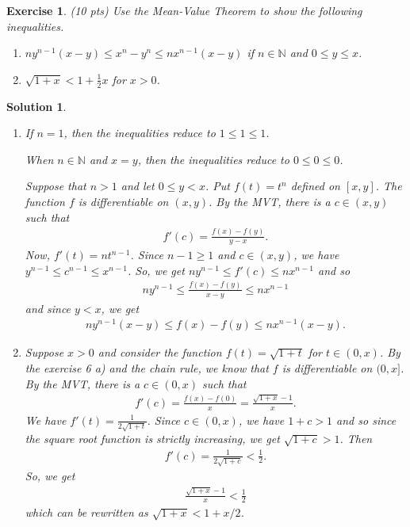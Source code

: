 \documentclass[12pt]{article}
\newcommand{\bN}{\mathbb{N}}
\theoremstyle{plain}
\newtheorem{exer}{\textbf{Exercise}}}
\theoremstyle{plain}
\newtheorem*{sol}{\textbf{Solution}}}
\theoremstyle{plain}
\theoremstyle{plain}
\begin{document}
\begin{exer}
(10 pts)
Use the Mean-Value Theorem to show the following inequalities.
	\begin{enumerate}[label=\textbf{\alph*)}]
	\item $n y^{n-1} (x - y) \leq x^n - y^n \leq n x^{n-1} (x - y)$ if $n \in \bN$ and $0 \leq y \leq x$.
	\item $\sqrt{1 + x} < 1 + \frac{1}{2} x$ for $x > 0$.
	\end{enumerate}
\end{exer}
\begin{sol}
\begin{enumerate}[label=\textbf{\alph*)}]
\item If $n = 1$, then the inequalities reduce to $1 \leq 1 \leq 1$. 

When $n \in \bN$ and $x = y$, then the inequalities reduce to $0 \leq 0 \leq 0$. 

Suppose that $n > 1$ and let $0 \leq y < x$. Put $f(t) = t^n$ defined on $[x, y]$. The function $f$ is differentiable on $(x, y)$. By the MVT, there is a $c \in (x, y)$ such that
	\begin{align*}
	f'(c) = \frac{f(x) - f(y)}{y - x} .
	\end{align*}
Now, $f'(t) = n t^{n-1}$. Since $n - 1 \geq 1$ and $c \in (x, y)$, we have $y^{n-1} \leq c^{n-1} \leq x^{n-1}$. So, we get $n y^{n-1} \leq f'(c) \leq n x^{n-1}$ and so
	\begin{align*}
	n y^{n-1} \leq \frac{f(x) - f(y)}{x - y} \leq n x^{n-1}
	\end{align*}
and since $y < x$, we get
	\begin{align*}
	n y^{n-1} (x- y) \leq f(x) - f(y) \leq nx^{n-1} (x - y) .
	\end{align*}
	\item Suppose $x > 0$ and consider the function $f(t) = \sqrt{1 + t}$ for $t \in (0, x)$. By the exercise 6 a) and the chain rule, we know that $f$ is differentiable on $(0, x]$. By the MVT, there is a $c \in (0, x)$ such that
		\begin{align*}
		f'(c) = \frac{f(x) - f(0)}{x} = \frac{\sqrt{1 + x} - 1}{x} .
		\end{align*}
	We have $f'(t) = \frac{1}{2\sqrt{1 + t}}$. Since $c \in (0, x)$, we have $1 + c > 1$ and so since the square root function is strictly increasing, we get $\sqrt{1 + c} > 1$. Then
		\begin{align*}
		f'(c) = \frac{1}{2 \sqrt{1 + c}} < \frac{1}{2} .
		\end{align*}
	So, we get
		\begin{align*}
		\frac{\sqrt{1 + x} - 1}{x} < \frac{1}{2}
		\end{align*}
	which can be rewritten as $\sqrt{1 + x} < 1 + x/2$.
\end{enumerate}
\end{sol}
\end{document}
